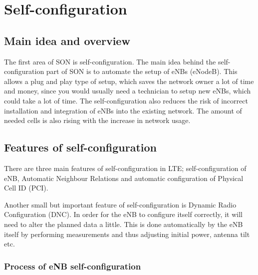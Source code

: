 \documentclass{report}
\begin{document}
\chapter{Self-configuration}
\section{Main idea and overview}
The first area of SON is self-configuration. The main idea behind the self-configuration part of SON is to automate the setup of eNBs (eNodeB). This allows a plug and play type of setup, which saves the network owner a lot of time and money, since you would usually need a technician to setup new eNBs, which could take a lot of time.  
The self-configuration also reduces the risk of incorrect installation and integration of eNBs into the existing network. The amount of needed cells is also rising with the increase in network usage.

\section{Features of self-configuration}
There are three main features of self-configuration in LTE; self-configuration of eNB, Automatic Neighbour Relations and automatic configuration of Physical Cell ID (PCI). 

Another small but important feature of self-configuration is Dynamic Radio Configuration (DNC). 
In order for the eNB to configure itself correctly, it will need to alter the planned data a little. This is done automatically by the eNB itself by performing measurements and thus adjusting initial power, antenna tilt etc. %


\subsection{Process of eNB self-configuration}
\end{document}
